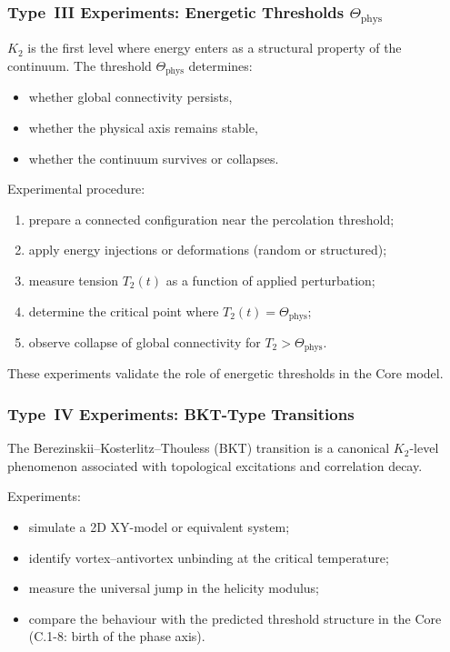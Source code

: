 \subsubsection{Type~III Experiments: Energetic Thresholds $\Theta_{\mathrm{phys}}$}

$K_2$ is the first level where energy enters as a structural property of the 
continuum.  
The threshold $\Theta_{\mathrm{phys}}$ determines:

\begin{itemize}
    \item whether global connectivity persists,
    \item whether the physical axis remains stable,
    \item whether the continuum survives or collapses.
\end{itemize}

Experimental procedure:

\begin{enumerate}
    \item prepare a connected configuration near the percolation threshold;
    \item apply energy injections or deformations (random or structured);
    \item measure tension $T_2(t)$ as a function of applied perturbation;
    \item determine the critical point where $T_2(t) = \Theta_{\mathrm{phys}}$;
    \item observe collapse of global connectivity for $T_2 > \Theta_{\mathrm{phys}}$.
\end{enumerate}

These experiments validate the role of energetic thresholds in the Core model.



\subsubsection{Type~IV Experiments: BKT-Type Transitions}

The Berezinskii–Kosterlitz–Thouless (BKT) transition is a canonical 
$K_2$-level phenomenon associated with topological excitations and 
correlation decay.

Experiments:

\begin{itemize}
    \item simulate a 2D XY-model or equivalent system;
    \item identify vortex–antivortex unbinding at the critical temperature;
    \item measure the universal jump in the helicity modulus;
    \item compare the behaviour with the predicted threshold structure in 
          the Core (C.1-8: birth of the phase axis).
\end{itemize}

